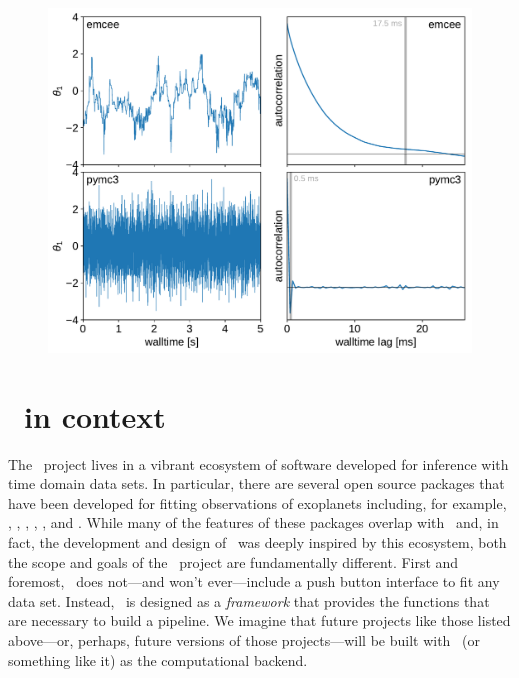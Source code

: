 \documentclass[modern]{aastex62}
\begin{document}


\begin{figure}[htbp]
\begin{centering}
\includegraphics[width=0.8\linewidth]{figures/gaussians.pdf}
\end{centering}
\end{figure}

\section{\exoplanet\ in context}

The \exoplanet\ project lives in a vibrant ecosystem of software developed for inference with time domain data sets.
In particular, there are several open source packages that have been developed for fitting observations of exoplanets including, for example,  \citep{Eastman:2019},  \citep{Espinoza:2019},  \citep{Gunther:2019},  \citep{Trifonov:2019},  \citep{Barragan:2019}, and  \citep{Fulton:2018}.
While many of the features of these packages overlap with \exoplanet\ and, in fact, the development and design of \exoplanet\ was deeply inspired by this ecosystem, both the scope and goals of the \exoplanet\ project are fundamentally different.
First and foremost, \exoplanet\ does not---and won't ever---include a push button interface to fit any data set.
Instead, \exoplanet\ is designed as a \emph{framework} that provides the functions that are necessary to build a pipeline.
We imagine that future projects like those listed above---or, perhaps, future versions of those projects---will be built with \exoplanet\ (or something like it) as the computational backend.
\end{document}
